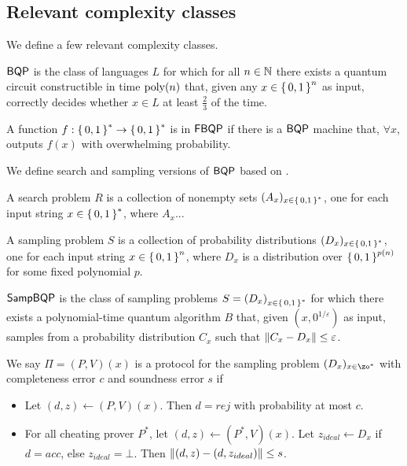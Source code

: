 \subsection{Relevant complexity classes}

We define a few relevant complexity classes.

\begin{definition} [$\BQP$]
	$\BQP$ is the class of languages $L$ for which for all $n\in\mathbb{N}$ there exists a quantum circuit constructible in time $\operatorname*{\operatorname{poly}}(n)$ that, given any $x\in\set{0, 1}^n$ as input, correctly decides whether $x\in L$ at least $\frac{2}{3}$ of the time.
\end{definition}

\begin{definition} [$\FBQP$]
	A function $f:\set{0,1}^*\rightarrow\set{0,1}^*$ is in $\FBQP$ if there is a $\BQP$ machine that, $\forall x$, outputs $f(x)$ with overwhelming probability.
\end{definition}

We define search and sampling versions of $\BQP$ based on \cite{aaronson_2013}.

\begin{definition} 
	A search problem $R$ is a collection of nonempty sets $(A_x)_{x\in\set{0, 1}^*}$, one for each input string $x\in\set{0, 1}^*$, where $A_x$... 
\end{definition}

\begin{definition} 
	A sampling problem $S$ is a collection of probability distributions $(D_x)_{x\in\set{0, 1}^*}$, one for each input string $x\in\set{0,1}^n$, where $D_x$ is a distribution over $\set{0,1}^{p(n)}$ for some fixed polynomial $p$.
\end{definition}

\begin{definition} [$\SampBQP$]
	$\SampBQP$ is the class of sampling problems $S=\left(D_x\right)_{x\in\set{0, 1}^*}$ for which there exists a polynomial-time quantum algorithm $B$ that, given $(x, 0^{1/\varepsilon})$ as input, samples from a probability distribution $C_x$ such that $\left\lVert C_x-D_x\right\rVert\leq\varepsilon$.
\end{definition}

\begin{definition}
	We say $\Pi=(P, V)(x)$ is a protocol for the sampling problem $(D_x)_{x\in\zo^*}$ with completeness error $c$ and soundness error $s$ if
	\begin{itemize}
		\item Let $(d, z)\leftarrow(P, V)(x)$. Then $d=rej$ with probability at most $c$.
		\item For all cheating prover $P^*$, let $(d, z)\leftarrow(P^*, V)(x)$. Let $z_{ideal}\leftarrow D_x$ if $d=acc$, else $z_{ideal}=\bot$. Then $\left\lVert(d, z) - (d, z_{ideal})\right\rVert \leq s$.
	\end{itemize}
\end{definition}

